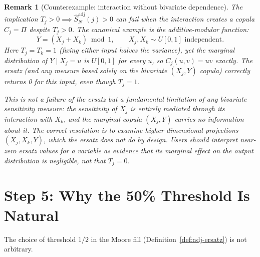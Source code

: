 \documentclass[11pt,a4paper]{article}
\newtheorem{remark}[theorem]{Remark}
\theoremstyle{definition}
\begin{document}
\begin{remark}[Counterexample: interaction without bivariate dependence]
\label{rem:counterexample}
The implication $T_j > 0 \implies \hat{S}^{\mathrm{adj}}_N(j) > 0$ can
fail when the interaction creates a copula $C_j = \Pi$ despite $T_j > 0$.
The canonical example is the additive-modular function:
\[
  Y = (X_j + X_k) \bmod 1, \qquad X_j, X_k \sim U[0,1] \text{ independent}.
\]
Here $T_j = T_k = 1$ (fixing either input halves the variance), yet the
marginal distribution of $Y \mid X_j = u$ is $U[0,1]$ for every $u$, so
$C_j(u,v) = uv$ exactly.  The ersatz (and any measure based solely on the
bivariate $(X_j, Y)$ copula) correctly returns 0 for this input, even
though $T_j = 1$.

This is not a failure of the ersatz but a fundamental limitation of any
bivariate sensitivity measure: the sensitivity of $X_j$ is entirely
mediated through its interaction with $X_k$, and the marginal copula
$(X_j, Y)$ carries no information about it.  The correct resolution is to
examine higher-dimensional projections $(X_j, X_k, Y)$, which the ersatz
does not do by design.  Users should interpret near-zero ersatz values for
a variable as evidence that \emph{its marginal effect on the output
distribution is negligible}, not that $T_j = 0$.
\end{remark}

\section{Step 5: Why the 50\% Threshold Is Natural}

The choice of threshold $1/2$ in the Moore fill (Definition~\ref{def:adj-ersatz})
is not arbitrary.
\end{document}
